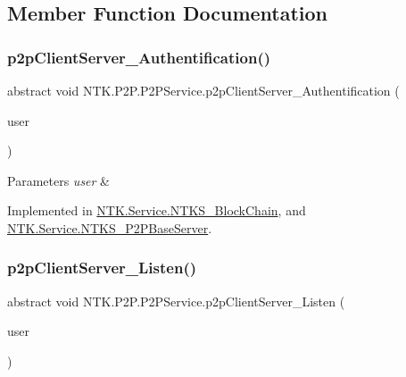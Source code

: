 \subsection{Member Function Documentation}
\mbox{\label{class_n_t_k_1_1_p2_p_1_1_p2_p_service_ac4adf79dade09cfcbb37a74632cdc6c2}} 
\subsubsection{\texorpdfstring{p2pClientServer\_Authentification()}{p2pClientServer\_Authentification()}}
{\footnotesize\ttfamily abstract void N\+T\+K.\+P2\+P.\+P2\+P\+Service.\+p2p\+Client\+Server\+\_\+\+Authentification (\begin{DoxyParamCaption}\item[{\mbox{\hyperlink{class_n_t_k_1_1_n_t_k_user}{N\+T\+K\+User}}}]{user }\end{DoxyParamCaption})\hspace{0.3cm}{\ttfamily [pure virtual]}}






\begin{DoxyParams}{Parameters}
{\em user} & \\
\hline
\end{DoxyParams}


Implemented in \mbox{\hyperlink{class_n_t_k_1_1_service_1_1_n_t_k_s___block_chain_a11c27887bafddcdae6f943ebe11a3462}{N\+T\+K.\+Service.\+N\+T\+K\+S\+\_\+\+Block\+Chain}}, and \mbox{\hyperlink{class_n_t_k_1_1_service_1_1_n_t_k_s___p2_p_base_server_aeed4f0e761b2b5366b1c5c5595941a26}{N\+T\+K.\+Service.\+N\+T\+K\+S\+\_\+\+P2\+P\+Base\+Server}}.

\mbox{\label{class_n_t_k_1_1_p2_p_1_1_p2_p_service_ab939632560ab084719e27dfcccea80df}} 
\subsubsection{\texorpdfstring{p2pClientServer\_Listen()}{p2pClientServer\_Listen()}}
{\footnotesize\ttfamily abstract void N\+T\+K.\+P2\+P.\+P2\+P\+Service.\+p2p\+Client\+Server\+\_\+\+Listen (\begin{DoxyParamCaption}\item[{\mbox{\hyperlink{class_n_t_k_1_1_n_t_k_user}{N\+T\+K\+User}}}]{user }\end{DoxyParamCaption})\hspace{0.3cm}{\ttfamily [pure virtual]}}






